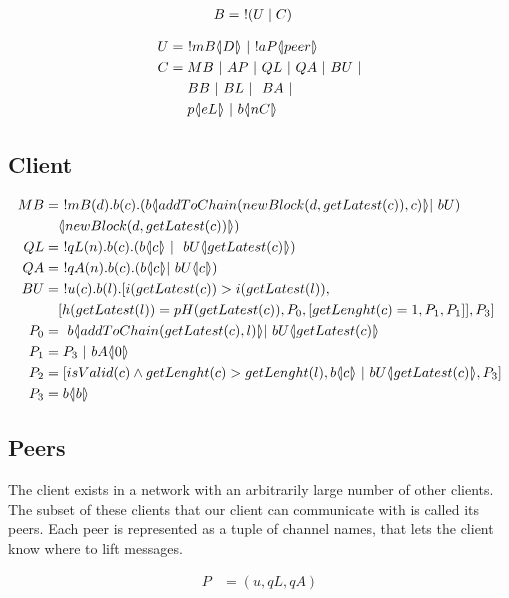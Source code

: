 \FloatBarrier


\begin{align*}
	B &=\ !(U\mid C)
\end{align*}

\begin{align*}
    U &=\ !mB \lift{}{D}\ |\ !aP\lift{}{peer}\\
    C &= MB\ |\ AP\ |\ QL\ |\ QA\ |\ BU\ |\\
    &\quad \ BB\ |\ BL\ |\ \ BA\ |\\
    &\quad \ p\lift{}{eL}\ |\ b\lift{}{nC}
\end{align*}

\subsection{Client}

\begin{align*}
    MB &=\ !mB(d).b(c).(b \lift{}{addToChain(newBlock(d,getLatest(c)),c)}| \ bU)\\
    &\quad \lift{}{newBlock(d, getLatest(c))})\\
    QL &=\ !qL(n).b(c).(b \lift{}{c}\ |\ \ bU\lift{}{getLatest(c)})\\
    QA &=\ !qA(n).b(c).(b\lift{}{c}| \ bU\lift{}{c})\\
    BU &=\ !u(c).b(l).[i( getLatest(c))>i(getLatest(l)),\\
    &\quad[h(getLatest( l))=pH(getLatest(c)),P_0, [getLenght(c)=1,P_1,P_1]],P_3]\\
    P_0 &=\ b\lift{}{addToChain(getLatest(c),l)}| \ bU\lift{}{getLatest(c)}\\
    P_1 &= P_3\ |\ bA \lift{}{0}\\
    P_2 &= [isValid(c) \land getLenght(c) > getLenght(l), b\lift{}{c}\ |\ bU \lift{}{getLatest(c)},P_3]\\
    P_3 &= b\lift{}{b}
\end{align*}

\subsection{Peers}
The client exists in a network with an arbitrarily large number of other clients.
The subset of these clients that our client can communicate with is called its peers.
Each peer is represented as a tuple of channel names, that lets the client know where to lift messages.

\begin{align*}
    P &= (u, qL, qA)
\end{align*}

